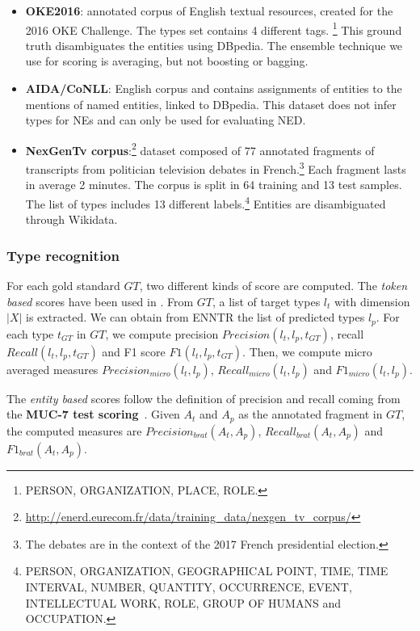 \documentclass{llncs}
\begin{document}
\begin{itemize}
 \item \textbf{OKE2016}: annotated corpus of English textual resources, created for the 2016 OKE Challenge. The types set contains 4 different tags. \footnote{PERSON, ORGANIZATION, PLACE, ROLE.} This ground truth disambiguates the entities using DBpedia. The ensemble technique we use for scoring is averaging, but not boosting or bagging.

 \item \textbf{AIDA/CoNLL}: English corpus and contains assignments of entities to the mentions of named entities, linked to DBpedia. This dataset does not infer types for NEs and can only be used for evaluating NED. 
 \item \textbf{NexGenTv corpus}:\footnote{\url{http://enerd.eurecom.fr/data/training_data/nexgen_tv_corpus/}} dataset composed of 77 annotated fragments of transcripts from politician television debates in French.\footnote{The debates are in the context of the 2017 French presidential election.} Each fragment lasts in average 2 minutes. The corpus is split in 64 training and 13 test samples. The list of types includes 13 different labels.\footnote{PERSON, ORGANIZATION, GEOGRAPHICAL POINT, TIME, TIME INTERVAL, NUMBER, QUANTITY, OCCURRENCE, EVENT, INTELLECTUAL WORK, ROLE, GROUP OF HUMANS and OCCUPATION.} Entities are disambiguated through Wikidata.
\end{itemize}

\subsubsection{Type recognition}
For each gold standard $GT$, two different kinds of score are computed.
The \textit{token based} scores have been used in \cite{fox1,fox2}. From $GT$, a list of target types $l_{t}$ with dimension $\left\vert{X}\right\vert$ is extracted. We can obtain from ENNTR the list of predicted types $l_{p}$. For each type $t_{GT}$ in $GT$, we compute precision $Precision(l_{t},l_{p},t_{GT})$, recall $Recall(l_{t},l_{p},t_{GT})$ and F1 score $F1(l_{t},l_{p},t_{GT})$. Then, we compute micro averaged measures $Precision_{micro}(l_{t},l_{p})$, $Recall_{micro}(l_{t},l_{p})$ and $F1_{micro}(l_{t},l_{p})$. \cite{sebastiani2002mltext}

The \textit{entity based} scores follow the definition of precision and recall coming from the \textbf{MUC-7 test scoring}~\cite{M98-1024}. Given $A_{t}$ and $A_{p}$ as the annotated fragment in $GT$, the computed measures are 
$Precision_{brat}(A_{t},A_{p})$, $Recall_{brat}(A_{t},A_{p})$ and 
$F1_{brat}(A_{t},A_{p})$. 
\end{document}
